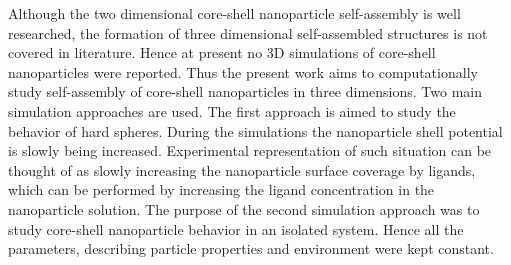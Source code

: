 Although the two dimensional core-shell nanoparticle self-assembly is well researched, the formation of three dimensional self-assembled structures is not covered in literature. Hence at present no 3D simulations of core-shell nanoparticles were reported. %
Thus the present work aims to computationally study self-assembly of core-shell nanoparticles in three dimensions. Two main simulation approaches are used. The first approach is aimed to study the behavior of hard spheres. During the simulations the nanoparticle shell potential is slowly being increased. Experimental representation of such situation can be thought of as slowly increasing the nanoparticle surface coverage by ligands, which can be performed by increasing the ligand concentration in the nanoparticle solution. The purpose of the second simulation approach was to study core-shell nanoparticle behavior in an isolated system. Hence all the parameters, describing particle properties and environment  were kept constant.

